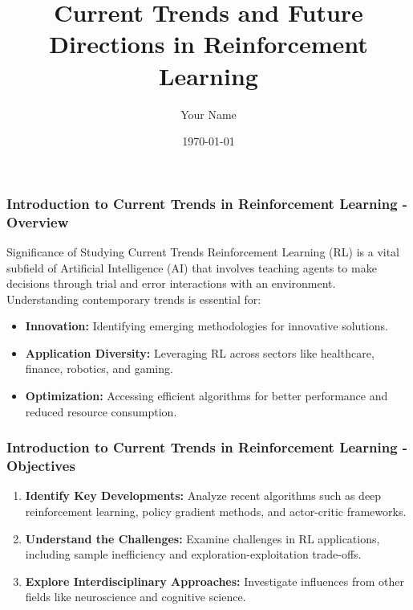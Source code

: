 \documentclass{beamer}
\title{Current Trends and Future Directions in Reinforcement Learning}
\author{Your Name}
\institute{Your Institution}
\date{\today}
\begin{document}
\frame{\titlepage}

\begin{frame}[fragile]
    \frametitle{Introduction to Current Trends in Reinforcement Learning - Overview}
    \begin{block}{Significance of Studying Current Trends}
        Reinforcement Learning (RL) is a vital subfield of Artificial Intelligence (AI) that involves teaching agents to make decisions through trial and error interactions with an environment. 
        Understanding contemporary trends is essential for:
    \end{block}
    \begin{itemize}
        \item \textbf{Innovation:} Identifying emerging methodologies for innovative solutions.
        \item \textbf{Application Diversity:} Leveraging RL across sectors like healthcare, finance, robotics, and gaming.
        \item \textbf{Optimization:} Accessing efficient algorithms for better performance and reduced resource consumption.
    \end{itemize}
\end{frame}

\begin{frame}[fragile]
    \frametitle{Introduction to Current Trends in Reinforcement Learning - Objectives}
    \begin{enumerate}
        \item \textbf{Identify Key Developments:} Analyze recent algorithms such as deep reinforcement learning, policy gradient methods, and actor-critic frameworks.
        
        \item \textbf{Understand the Challenges:} Examine challenges in RL applications, including sample inefficiency and exploration-exploitation trade-offs.
        
        \item \textbf{Explore Interdisciplinary Approaches:} Investigate influences from other fields like neuroscience and cognitive science.
    \end{enumerate}
\end{frame}
\end{document}
